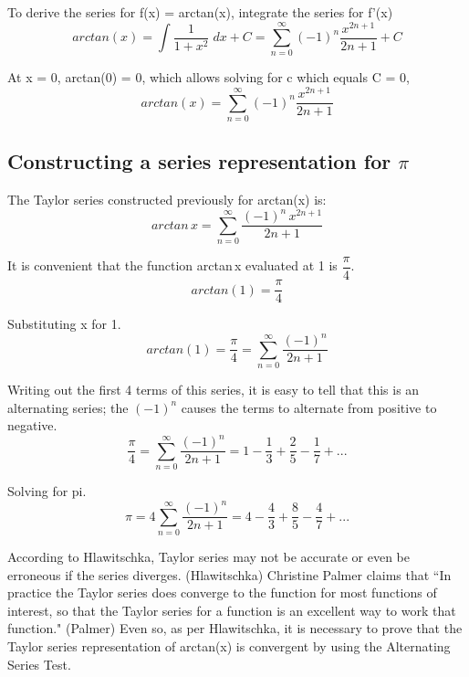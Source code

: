 \documentclass[12pt, titlepage]{article}
\begin{document}
To derive the series for f(x) = arctan(x), integrate the series for f'(x)
\begin{equation}
    arctan(x) = \int \frac{1}{1+x^{2}} \; dx + C = \sum_{n=0}^{\infty} (-1)^{n}\frac{x^{2n+1}}{2n+1} + C
\end{equation}

At x = 0, arctan(0) = 0, which allows solving for c which equals C = 0,
\begin{equation}
    arctan(x) = \sum_{n=0}^{\infty} (-1)^{n}\frac{x^{2n+1}}{2n+1} 
\end{equation}

\subsection{Constructing a series representation for \(\pi\)}
The Taylor series constructed previously for arctan(x) is:
\begin{equation}
    arctan\,x = \sum^{\infty}_{n=0} \frac{(-1)^{n}\,x^{2n+1}}{2n+1}
\end{equation}

It is convenient that the function arctan\,x evaluated at 1 is \(\dfrac{\pi}{4}\).
\begin{equation}
    arctan(1) = \frac{\pi}{4}
\end{equation}

Substituting x for 1.
\begin{equation}
    arctan(1) = \frac{\pi}{4} = \sum_{n=0}^\infty{ \frac{(-1)^n}{2n+1}}
\end{equation}

Writing out the first 4 terms of this series, it is easy to tell that this is an alternating series; the \((-1)^{n}\) causes the terms to alternate from positive to negative.
\begin{equation}
    \frac{\pi}{4} =\sum_{n=0}^\infty{ \frac{(-1)^n}{2n+1} = 1 - \frac{1}{3} + \frac{2}{5} - \frac{1}{7} + ... }
\end{equation}

Solving for pi.
\begin{equation}
    \pi = 4 \sum_{n=0}^\infty{ \frac{(-1)^n}{2n+1} = 4 - \frac{4}{3} + \frac{8}{5} - \frac{4}{7} + ... }
\end{equation}

According to Hlawitschka, Taylor series may not be accurate or even be erroneous if the series diverges. (Hlawitschka) Christine Palmer claims that ``In practice the Taylor series does converge to the function for most functions of interest, so that the Taylor series for a function is an excellent way to work that function." (Palmer) Even so, as per Hlawitschka, it is necessary to prove that the Taylor series representation of arctan(x) is convergent by using the Alternating Series Test.
\end{document}
